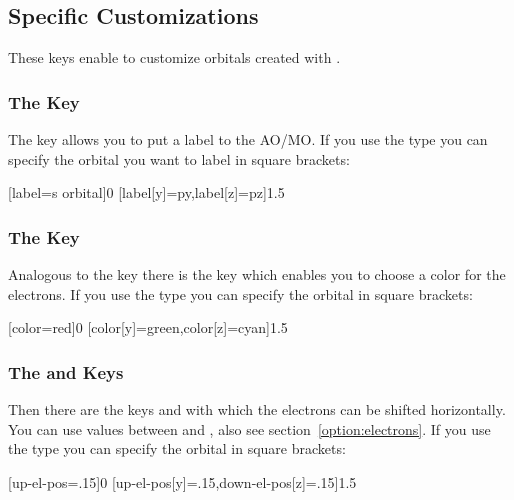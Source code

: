 \documentclass[load-preamble+]{cnltx-doc}
\begin{document}
\subsection{ Specific Customizations}\label{ssec:AO_anpassen}
These keys enable to customize orbitals created with .

\subsubsection{The  Key}\label{key:AO_label}
The key  allows you to put a
label to the \ac{AO}/\ac{MO}.  If you use the type  you can specify
the orbital you want to label in square brackets:
\begin{example}
  \begin{MOdiagram}[style=square]
    [label={s orbital}]{0}
    [label[y]=py,label[z]=pz]{1.5}
  \end{MOdiagram}
\end{example}

\subsubsection{The  Key}\label{key:AO_color}
Analogous to the  key there is the key
 which enables you to choose a
color for the electrons.  If you use the type  you can specify the
orbital in square brackets:
\begin{example}
  \begin{MOdiagram}[style=square]
    [color=red]{0}
    [color[y]=green,color[z]=cyan]{1.5}
  \end{MOdiagram}
\end{example}

\subsubsection{The  and  Keys}\label{key:AO_electrons}
Then there are the keys 
and  with which the
electrons can be shifted horizontally.  You can use values between 
and , also see section~\ref{option:electrons}.  If you use the type
 you can specify the orbital in square brackets:
\begin{example}
  \begin{MOdiagram}[style=square]
    [up-el-pos=.15]{0}
    [up-el-pos[y]=.15,down-el-pos[z]=.15]{1.5}
  \end{MOdiagram}
\end{example}
\end{document}
